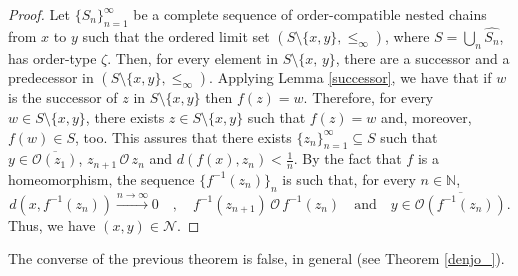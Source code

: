 \documentclass[10pt,a4paper]{article}
\theoremstyle{definition}
\theoremstyle{remark}
\theoremstyle{plain}
\newtheorem{thm}[defi]{Theorem}
\newtheorem{rem}[defi]{Remark}
\begin{document}
\begin{proof}
    Let $\{S_n\}_{n=1}^{\infty}$ be a complete sequence of order-compatible nested chains from $x$ to $y$ such that the ordered limit set $(S\setminus\{x,y\},\le_\infty)$, where $S=\bigcup_n\widehat{S_n}$, has order-type $\zeta$. Then, for every element in $S\setminus\{x,\,y\}$, there are a successor and a predecessor in $(S\setminus\{x,y\},\le_\infty)$. Applying Lemma \ref{successor}, we have that if $w$ is the successor of $z$ in $S\setminus\{x,y\}$ then $f(z)=w$. Therefore, for every $w\in S\setminus\{x,y\}$, there exists $z\in S\setminus\{x,y\}$ such that $f(z)=w$ and, moreover, $f(w)\in S$, too.
    This assures that there exists $\{z_n\}_{n=1}^\infty\subseteq S$
    such that $y\in \overline{\mathcal{O}(z_1)}$, $z_{n+1}\,\mathcal{O}\, z_n$ and $d(f(x),z_n)<\frac{1}{n}$.
    By the fact that $f$ is a homeomorphism, the sequence $\{f^{-1}(z_n)\}_n$ is such that, for every $n\in\mathbb N$,
    $$d(x,f^{-1}(z_n))\xrightarrow{n\to\infty}0\quad,\quad f^{-1}(z_{n+1})\,\mathcal{O}\,f^{-1}(z_n)\quad\text{and}\quad y\in\overline{\mathcal{O}(f^{-1}(z_n))}.$$
    Thus, we have $(x,y)\in\mathcal{N}$.
\end{proof}
The converse of the previous theorem is false, in general (see Theorem \ref{denjo_}).


\end{document}
